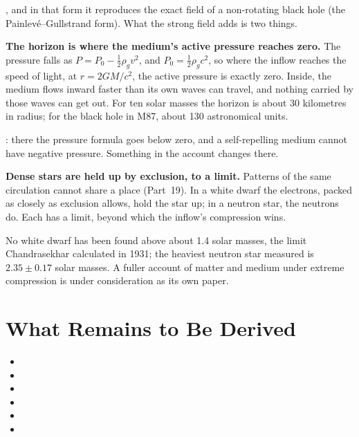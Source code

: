 \documentclass[11pt,a4paper]{article}
\begin{document}
, and in that form it reproduces the exact field of a non-rotating black hole (the Painlevé--Gullstrand form). What the strong field adds is two things.

\begin{hypbar}
\textbf{The horizon is where the medium's active pressure reaches zero.} The pressure falls as $P = P_0 - \tfrac12\rho_g v^2$, and $P_0 = \tfrac12\rho_g c^2$, so where the inflow reaches the speed of light, at $r = 2GM/c^2$, the active pressure is exactly zero. Inside, the medium flows inward faster than its own waves can travel, and nothing carried by those waves can get out. For ten solar masses the horizon is about 30 kilometres in radius; for the black hole in M87, about 130 astronomical units.
\end{hypbar}

: there the pressure formula goes below zero, and a self-repelling medium cannot have negative pressure. Something in the account changes there.

\begin{hypbar}
\textbf{Dense stars are held up by exclusion, to a limit.} Patterns of the same circulation cannot share a place (Part~19). In a white dwarf the electrons, packed as closely as exclusion allows, hold the star up; in a neutron star, the neutrons do. Each has a limit, beyond which the inflow's compression wins.
\end{hypbar}
 No white dwarf has been found above about 1.4 solar masses, the limit Chandrasekhar calculated in 1931; the heaviest neutron star measured is $2.35\pm0.17$ solar masses. A fuller account of matter and medium under extreme compression is under consideration as its own paper.

\section{What Remains to Be Derived}
\label{sec:owed}

\begin{itemize}
\item {}
\item {}
\item {}
\item {}
\item {}
\item {}
\end{itemize}
\end{document}
